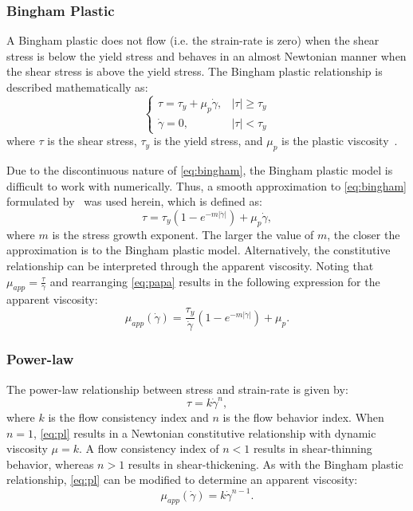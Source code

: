 \subsubsection{Bingham Plastic} \label{sec:bp}

A Bingham plastic does not flow (i.e. the strain-rate is zero) when the shear stress is below the yield stress and behaves in an almost Newtonian manner when the shear stress is above the yield stress.
The Bingham plastic relationship is described mathematically as:
\begin{equation} \label{eq:bingham}
\begin{cases}
\tau = \tau_y + \mu_p \dot{\gamma}, & |\tau| \geq \tau_y \\
\dot{\gamma} = 0, & |\tau| < \tau_y
\end{cases}
\end{equation}
\noindent where $\tau$ is the shear stress, $\tau_y$ is the yield stress, and $\mu_p$ is the plastic viscosity~\cite{bingham1922fluidity}.

Due to the discontinuous nature of \eqref{eq:bingham}, the Bingham plastic model is difficult to work with numerically.
Thus, a smooth approximation to \eqref{eq:bingham} formulated by~\citet{papanastasiou1987flows} was used herein, which is defined as:
\begin{equation} \label{eq:papa}
\tau = \tau_y (1 - e^{-m |\dot{\gamma}|}) + \mu_p \dot{\gamma},
\end{equation}
\noindent where $m$ is the stress growth exponent.
The larger the value of $m$, the closer the approximation is to the Bingham plastic model.
Alternatively, the constitutive relationship can be interpreted through the apparent viscosity.
Noting that $\mu_{app} = \frac{\tau}{\dot{\gamma}}$ and rearranging \eqref{eq:papa} results in the following expression for the apparent viscosity:
\begin{equation} \label{eq:bing-mu-app}
  \mu_{app}(\dot{\gamma}) = \frac{\tau_y}{\dot{\gamma}} (1 - e^{-m |\dot{\gamma}|}) + \mu_p.
\end{equation}

\subsubsection{Power-law}

The power-law relationship between stress and strain-rate is given by:
\begin{equation} \label{eq:pl}
\tau = k \dot{\gamma}^n,
\end{equation}
\noindent where $k$ is the flow consistency index and $n$ is the flow behavior index.
When $n = 1$, \eqref{eq:pl} results in a Newtonian constitutive relationship with dynamic viscosity $\mu = k$.
A flow consistency index of $n < 1$ results in shear-thinning behavior, whereas $n > 1$ results in shear-thickening.
As with the Bingham plastic relationship, \eqref{eq:pl} can be modified to determine an apparent viscosity:
\begin{equation} \label{eq:pl-mu-app}
  \mu_{app}(\dot{\gamma}) = k \dot{\gamma}^{n-1}.
\end{equation}

